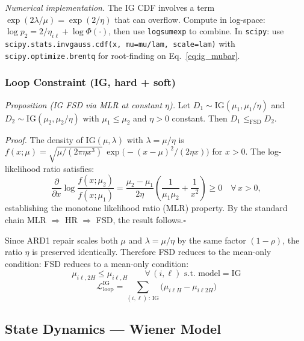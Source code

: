 \documentclass[11pt,a4paper]{article}
\begin{document}
\emph{Numerical implementation.}
The IG CDF involves a term $\exp(2\lambda/\mu) = \exp(2/\eta)$ that can overflow.
Compute in log-space: $\log p_2 = 2/\eta_{i\ell} + \log\Phi(\cdot)$, then use
\texttt{logsumexp} to combine. In \texttt{scipy}:
use \texttt{scipy.stats.invgauss.cdf(x, mu=mu/lam, scale=lam)} with
\texttt{scipy.optimize.brentq} for root-finding on
Eq.~\eqref{eq:ig_mubar}.

\subsubsection{Loop Constraint (IG, hard + soft)}

\emph{Proposition (IG FSD via MLR at constant $\eta$).}
Let $D_1 \sim \mathrm{IG}(\mu_1, \mu_1/\eta)$ and
$D_2 \sim \mathrm{IG}(\mu_2, \mu_2/\eta)$ with $\mu_1 \leq \mu_2$ and $\eta > 0$
constant. Then $D_1 \leq_{\mathrm{FSD}} D_2$.

\emph{Proof.}
The density of $\mathrm{IG}(\mu, \lambda)$ with $\lambda = \mu/\eta$ is
$f(x; \mu) = \sqrt{\mu/(2\pi\eta x^3)}\,
\exp\!\bigl(-{(x-\mu)^2}/{(2\eta x)}\bigr)$ for $x > 0$.
The log-likelihood ratio satisfies:
\[
  \frac{\partial}{\partial x} \log \frac{f(x;\mu_2)}{f(x;\mu_1)}
  = \frac{\mu_2 - \mu_1}{2\eta}\!\left(\frac{1}{\mu_1 \mu_2} + \frac{1}{x^2}\right)
  \geq 0
  \quad \forall\, x > 0,
\]
establishing the monotone likelihood ratio (MLR) property. By the standard chain
MLR $\Rightarrow$ HR $\Rightarrow$ FSD, the result follows.\hfill$\square$

Since ARD1 repair scales both $\mu$ and $\lambda = \mu/\eta$ by the same factor
$(1-\rho)$, the ratio $\eta$ is preserved identically. Therefore FSD reduces to the
mean-only condition:
FSD reduces to a mean-only condition:
\begin{equation}
  \mu_{i\ell,2H} \leq \mu_{i\ell,H}
  \qquad \forall\,(i,\ell)\text{ s.t. model} = \mathrm{IG}
\end{equation}
\begin{equation}
  \mathcal{L}^{\mathrm{IG}}_{\mathrm{loop}} =
    \sum_{(i,\ell)\,:\,\mathrm{IG}} \bigl(\mu_{i\ell H} - \mu_{i\ell 2H}\bigr)
\end{equation}

\subsection{State Dynamics --- Wiener Model}
\label{sec:dyn_wiener}
\end{document}
